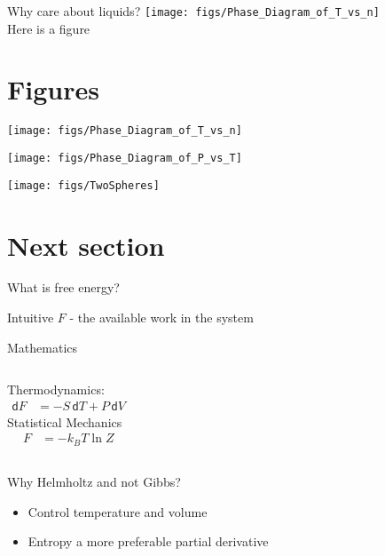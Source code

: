 \documentclass{beamer}
\newcommand*{\diff}{\mathsf{d}}
\begin{document}
\begin{frame}{Why care about liquids?}
    \centering
    \texttt{[image: figs/Phase\_Diagram\_of\_T\_vs\_n]}\\
    \vspace{-1em}
    Here is a figure
\end{frame}

\section*{Figures}
\begin{frame}{}
    \texttt{[image: figs/Phase\_Diagram\_of\_T\_vs\_n]}
\end{frame}
\begin{frame}{}
    \texttt{[image: figs/Phase\_Diagram\_of\_P\_vs\_T]}
\end{frame}
\begin{frame}{}
    \texttt{[image: figs/TwoSpheres]}
\end{frame}

\section*{Next section}
\begin{frame}{What is free energy?}
	\begin{block}{Intuitive}
			$F$ - the available work in the system
	\end{block}
    \begin{block}{Mathematics}
		\vspace{1em}
		\begin{columns}[t]
		{\centering Thermodynamics:
		\begin{align*}
			\diff F &= - S\,  \diff T + P\, \diff V
		\end{align*}}
		{\centering
		Statistical Mechanics
		\begin{align*}
		F &= - k_B T \ln Z
		\end{align*}}
		\end{columns}
    \end{block}		
		Why Helmholtz and not Gibbs?
	\begin{itemize}
		\item Control temperature and volume 
		\item Entropy a more preferable partial derivative
	\end{itemize}
\end{frame}
\end{document}
